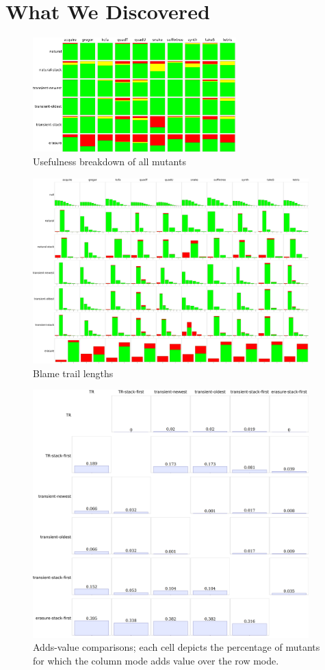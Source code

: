 \section{What We Discovered}

\begin{figure}
  \centering
  \includegraphics[width=0.7\textwidth]{./plots/usefulness-table}
  \caption{Usefulness breakdown of all mutants}
  \label{fig:usefulness-table}
\end{figure}

\begin{figure}
  \centering
  \includegraphics[width=0.95\textwidth]{./plots/bt-lengths-table}
  \caption{Blame trail lengths}
  \label{fig:usefulness-table}
\end{figure}

\begin{figure}
  \centering
  \includegraphics[width=0.95\textwidth]{./plots/avo-matrix}
  \caption{Adds-value comparisons; each cell depicts the percentage of mutants for which the column mode adds value over the row mode.}
  \label{fig:avo-matrix}
\end{figure}




